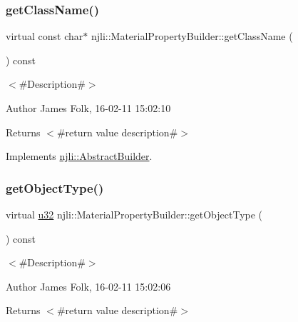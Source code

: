 \subsubsection{\texorpdfstring{get\+Class\+Name()}{getClassName()}}
{\footnotesize\ttfamily virtual const char$\ast$ njli\+::\+Material\+Property\+Builder\+::get\+Class\+Name (\begin{DoxyParamCaption}{ }\end{DoxyParamCaption}) const\hspace{0.3cm}{\ttfamily [virtual]}}



$<$\#\+Description\#$>$ 

\begin{DoxyAuthor}{Author}
James Folk, 16-\/02-\/11 15\+:02\+:10
\end{DoxyAuthor}
\begin{DoxyReturn}{Returns}
$<$\#return value description\#$>$ 
\end{DoxyReturn}


Implements \mbox{\hyperlink{classnjli_1_1_abstract_builder_a902f73ea78031b06aca183a417f3413b}{njli\+::\+Abstract\+Builder}}.

\mbox{\label{classnjli_1_1_material_property_builder_a1826a34f12138d11c777889a47a20fa6}} 
\subsubsection{\texorpdfstring{get\+Object\+Type()}{getObjectType()}}
{\footnotesize\ttfamily virtual \mbox{\hyperlink{_util_8h_a10e94b422ef0c20dcdec20d31a1f5049}{u32}} njli\+::\+Material\+Property\+Builder\+::get\+Object\+Type (\begin{DoxyParamCaption}{ }\end{DoxyParamCaption}) const\hspace{0.3cm}{\ttfamily [virtual]}}



$<$\#\+Description\#$>$ 

\begin{DoxyAuthor}{Author}
James Folk, 16-\/02-\/11 15\+:02\+:06
\end{DoxyAuthor}
\begin{DoxyReturn}{Returns}
$<$\#return value description\#$>$ 
\end{DoxyReturn}


